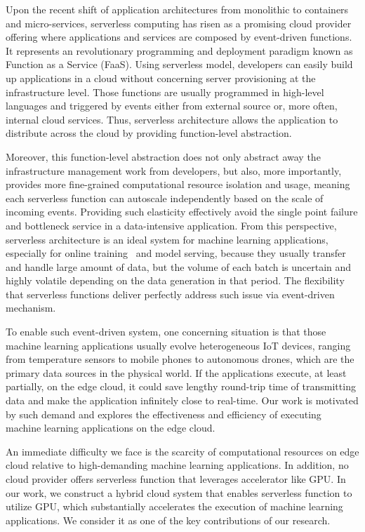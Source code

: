 Upon the recent shift of application architectures from monolithic to containers and micro-services, serverless computing has risen as a promising cloud provider offering where applications and services are composed by event-driven functions. It represents an revolutionary programming and deployment paradigm known as Function as a Service (FaaS). Using serverless model, developers can easily build up applications in a cloud without concerning server provisioning at the infrastructure level. Those functions are usually programmed in high-level languages and triggered by events either from external source or, more often, internal cloud services. Thus, serverless architecture allows the application to distribute across the cloud by providing function-level abstraction.

Moreover, this function-level abstraction does not only abstract away the infrastructure management work from developers, but also, more importantly, provides more fine-grained computational resource isolation and usage, meaning each serverless function can autoscale independently based on the scale of incoming events. Providing such elasticity effectively avoid the single point failure and bottleneck service in a data-intensive application. From this perspective, serverless architecture is an ideal system for machine learning applications, especially for online training~\cite{ref:online} and model serving, because they usually transfer and handle large amount of data, but the volume of each batch is uncertain and highly volatile depending on the data generation in that period. The flexibility that serverless functions deliver perfectly address such issue via event-driven mechanism. 

To enable such event-driven system, one concerning situation is that those machine learning applications usually evolve heterogeneous IoT devices, ranging from temperature sensors to mobile phones to autonomous drones, which are the primary data sources in the physical world. If the applications execute, at least partially, on the edge cloud, it could save lengthy round-trip time of transmitting data and make the application infinitely close to real-time. Our work is motivated by such demand and explores the effectiveness and efficiency of executing machine learning applications on the edge cloud. 

An immediate difficulty we face is the scarcity of computational resources on edge cloud relative to high-demanding machine learning applications. In addition, no cloud provider offers serverless function that leverages accelerator like GPU. In our work, we construct a hybrid cloud system that enables serverless function to utilize GPU, which substantially accelerates the execution of machine learning applications. We consider it as one of the key contributions of our research.

